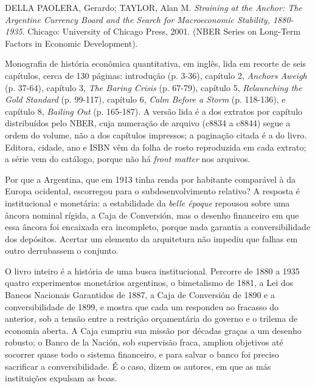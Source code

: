
\begin{identificacao}
DELLA PAOLERA, Gerardo; TAYLOR, Alan M. \emph{Straining at the Anchor: The
Argentine Currency Board and the Search for Macroeconomic Stability,
1880-1935}. Chicago: University of Chicago Press, 2001. (NBER Series on
Long-Term Factors in Economic Development).

Monografia de história econômica quantitativa, em inglês, lida em recorte de
seis capítulos, cerca de 130 páginas: introdução (p. 3-36), capítulo 2,
\emph{Anchors Aweigh} (p. 37-64), capítulo 3, \emph{The Baring Crisis}
(p. 67-79), capítulo 5, \emph{Relaunching the Gold Standard} (p. 99-117),
capítulo 6, \emph{Calm Before a Storm} (p. 118-136), e capítulo 8,
\emph{Bailing Out} (p. 165-187). A versão lida é a dos extratos por capítulo
distribuídos pelo NBER, cuja numeração de arquivo (c8834 a c8844) segue a ordem
do volume, não a dos capítulos impressos; a paginação citada é a do livro.
Editora, cidade, ano e ISBN vêm da folha de rosto reproduzida em cada extrato;
a série vem do catálogo, porque não há \emph{front matter} nos arquivos.
\end{identificacao}

Por que a Argentina, que em 1913 tinha renda por habitante comparável à da
Europa ocidental, escorregou para o subdesenvolvimento relativo? A resposta é
institucional e monetária: a estabilidade da \emph{belle époque} repousou sobre
uma âncora nominal rígida, a Caja de Conversión, mas o desenho financeiro em
que essa âncora foi encaixada era incompleto, porque nada garantia a
conversibilidade dos depósitos. Acertar um elemento da arquitetura não impediu
que falhas em outro derrubassem o conjunto.

O livro inteiro é a história de uma busca institucional. Percorre de 1880 a
1935 quatro experimentos monetários argentinos, o bimetalismo de 1881, a Lei
dos Bancos Nacionais Garantidos de 1887, a Caja de Conversión de 1890 e a
conversibilidade de 1899, e mostra que cada um respondeu ao fracasso do
anterior, sob a tensão entre a restrição orçamentária do governo e o trilema de
economia aberta. A Caja cumpriu sua missão por décadas graças a um desenho
robusto; o Banco de la Nación, sob supervisão fraca, ampliou objetivos até
socorrer quase todo o sistema financeiro, e para salvar o banco foi preciso
sacrificar a conversibilidade. É o caso, dizem os autores, em que as más
instituições expulsam as boas.

